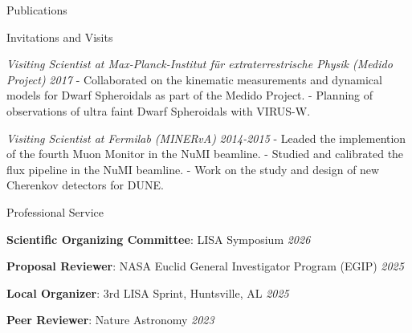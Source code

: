 \documentclass{resume}
\begin{document}
\begin{rSection}{Publications} 
\noindent
\begingroup
\renewcommand{\section}[2]{}%
\nocite{*}
{}

\endgroup
\end{rSection}

\begin{rSection}{Invitations and Visits}
\item \textit{Visiting Scientist at Max-Planck-Institut f\"ur extraterrestrische Physik (Medido Project)} \hfill{\em 2017}
\subitem - Collaborated on the kinematic measurements and dynamical models for \subitem Dwarf Spheroidals as part of the Medido Project.
\subitem - Planning of observations of ultra faint Dwarf Spheroidals with VIRUS-W.
\item \textit{Visiting Scientist at Fermilab (MINERvA)}  \hfill{\em 2014-2015}
\subitem - Leaded the implemention of the fourth Muon Monitor in the NuMI beamline.
\subitem - Studied and calibrated the flux pipeline in the NuMI beamline.
\subitem - Work on the study and design of new Cherenkov detectors for DUNE.
\end{rSection}

\begin{rSection}{Professional Service}
\item \textbf{Scientific Organizing Committee}: LISA Symposium \hfill{\em 2026}
\item \textbf{Proposal Reviewer}: NASA Euclid General Investigator Program (EGIP) \hfill{\em 2025}
\item \textbf{Local Organizer}: 3rd LISA Sprint, Huntsville, AL \hfill{\em 2025}
\item \textbf{Peer Reviewer}: Nature Astronomy \hfill{\em 2023}


\end{rSection}
\end{document}
